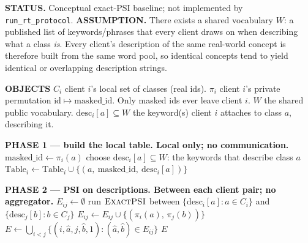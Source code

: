\documentclass[11pt]{article}
\newcommand{\psiexact}{\textsc{ExactPSI}}
\begin{document}
\begin{algorithm}[p]
\caption{Shared-vocabulary description PSI}
\label{alg:a1}
\footnotesize
{}
\begin{algorithmic}[1]

\Statex \hrulefill
\Statex \textbf{STATUS.} Conceptual exact-PSI baseline; not implemented by \texttt{run\_rt\_protocol}.
\Statex \textbf{ASSUMPTION.} There exists a shared vocabulary $W$: a
        published list of keywords/phrases that every client draws on when
        describing what a class \emph{is}. Every client's description of the
        same real-world concept is therefore built from the same word pool,
        so identical concepts tend to yield identical or overlapping
        description strings.

\Statex \textbf{OBJECTS}
\Statex \quad $C_i$ \quad client $i$'s local set of classes (real ids).
\Statex \quad $\pi_i$ \quad client $i$'s private permutation
        $\mathrm{id} \mapsto \mathrm{masked\_id}$. Only masked ids ever leave
        client $i$.
\Statex \quad $W$ \quad the shared public vocabulary.
\Statex \quad $\mathrm{desc}_i[a] \subseteq W$ \quad the keyword(s) client $i$
        attaches to class $a$, describing it.

\Statex \hrulefill
\Statex \textbf{PHASE 1 --- build the local table. Local only; no
        communication.}
    \State $\mathrm{masked\_id} \gets \pi_i(a)$
    \State choose $\mathrm{desc}_i[a] \subseteq W$: the keywords that
           describe class $a$
    \State $\mathrm{Table}_i \gets \mathrm{Table}_i \cup
           \{(a,\ \mathrm{masked\_id},\ \mathrm{desc}_i[a])\}$
  \EndFor
\EndFor

\Statex \hrulefill
\Statex \textbf{PHASE 2 --- PSI on descriptions. Between each client pair; no
        aggregator.}
  \State $E_{ij} \gets \emptyset$
  \State run $\psiexact$ between $\{\mathrm{desc}_i[a] : a \in C_i\}$ and
         $\{\mathrm{desc}_j[b] : b \in C_j\}$
    \State $E_{ij} \gets E_{ij} \cup \{(\pi_i(a),\, \pi_j(b))\}$
  \EndFor
\EndFor
\State $E \gets \bigcup_{i<j}\{(i,\hat a,j,\hat b,1):(\hat a,\hat b)\in E_{ij}\}$
\State \Return $E$
\Statex \hrulefill

\end{algorithmic}
\end{algorithm}
\end{document}
